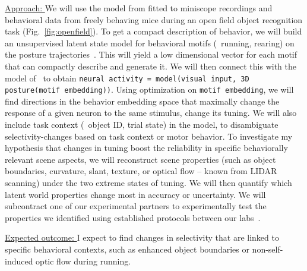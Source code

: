 \documentclass[COG,11pt]{ercgrant}
\begin{document}
\underline{Approach: } 
We will use the model from  fitted to miniscope recordings and behavioral data from freely behaving mice during an open field object recognition task (Fig.~\ref{fig:openfield}).
To get a compact description of behavior, we will build an unsupervised latent state model for behavioral motifs (\eg~running, rearing) on the posture trajectories~\parencite[similar to][]{Wiltschko2015-ey, Wiltschko2020-zd}.
This will yield a low dimensional vector for each motif that can compactly describe and generate it. %
We will then connect this with the model of~ to obtain \texttt{neural activity = model(visual input, 3D posture(motif embedding))}. 
Using optimization on \texttt{motif embedding}, we will find directions in the behavior embedding space that maximally change the response of a given neuron to the same stimulus, \ie change its tuning.
We will also include task context (\eg~object ID, trial state) in the model, to disambiguate selectivity-changes based on task context or motor behavior.
To investigate my hypothesis that changes in tuning boost the reliability in specific behaviorally relevant scene aspects, we will reconstruct scene properties (such as object boundaries, curvature, slant, texture, or optical flow -- known from LIDAR scanning) under the two extreme states of tuning. 
We will then quantify which latent world properties change most in accuracy or uncertainty.
We will subcontract one of our experimental partners to experimentally test the properties we identified using established protocols between our labs~\parencite[used in \eg][]{Walker2019-yw, Franke2022-do}.

\underline{Expected outcome: } I expect to find changes in selectivity that are linked to specific behavioral contexts, such as enhanced object boundaries or non-self-induced optic flow during running.
\end{document}

